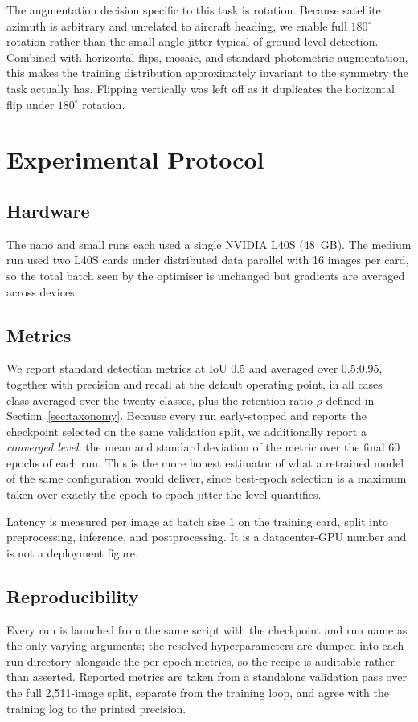 \documentclass[conference]{IEEEtran}
\begin{document}
The augmentation decision specific to this task is rotation. Because satellite
azimuth is arbitrary and unrelated to aircraft heading, we enable full
$180^\circ$ rotation rather than the small-angle jitter typical of ground-level
detection. Combined with horizontal flips, mosaic, and standard photometric
augmentation, this makes the training distribution approximately invariant to
the symmetry the task actually has. Flipping vertically was left off as it
duplicates the horizontal flip under $180^\circ$ rotation.

\section{Experimental Protocol}
\label{sec:setup}

\subsection{Hardware}
The nano and small runs each used a single NVIDIA L40S (48~GB). The medium run
used two L40S cards under distributed data parallel with 16 images per card, so
the total batch seen by the optimiser is unchanged but gradients are averaged
across devices.

\subsection{Metrics}
We report standard detection metrics at IoU 0.5 and averaged over 0.5:0.95,
together with precision and recall at the default operating point, in all cases
class-averaged over the twenty classes, plus the retention ratio $\rho$ defined
in Section~\ref{sec:taxonomy}. Because every run early-stopped and reports the
checkpoint selected on the same validation split, we additionally report a
\emph{converged level}: the mean and standard deviation of the metric over the
final 60 epochs of each run. This is the more honest estimator of what a
retrained model of the same configuration would deliver, since best-epoch
selection is a maximum taken over exactly the epoch-to-epoch jitter the level
quantifies.

Latency is measured per image at batch size 1 on the training card, split into
preprocessing, inference, and postprocessing. It is a datacenter-GPU number and
is not a deployment figure.

\subsection{Reproducibility}
Every run is launched from the same script with the checkpoint and run name as
the only varying arguments; the resolved hyperparameters are dumped into each
run directory alongside the per-epoch metrics, so the recipe is auditable rather
than asserted. Reported metrics are taken from a standalone validation pass over
the full 2{,}511-image split, separate from the training loop, and agree with the
training log to the printed precision.
\end{document}
